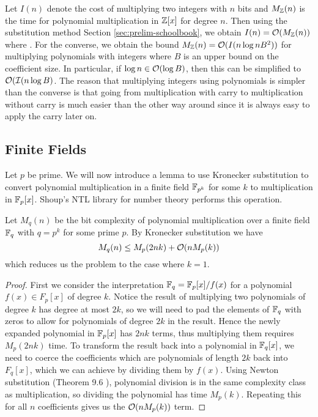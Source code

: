 Let $I(n)$ denote the cost of multiplying two integers with $n$ bits and $M_{\mathbb Z}(n)$ is the time for polynomial multiplication in ${\mathbb Z}[x]$ for degree $n$. Then using the substitution method Section \ref{sec:prelim-schoolbook}, we obtain $I(n) = \mathcal O(M_{\mathbb Z}(n))$ where . For the converse, we obtain the bound $M_{\mathbb Z}(n) = \mathcal O(I(n\log nB^2))$ for multiplying polynomials with integers where $B$ is an upper bound on the coefficient size. In particular, if $\log n \in \mathcal O(\log B)$, then this can be simplified to $\mathcal O(\mathcal I(n \log B)$. The reason that multiplying integers using polynomials is simpler than the converse is that going from multiplication with carry to multiplication without carry is much easier than the other way around since it is always easy to apply the carry later on.

\subsection{Finite Fields}%
\label{sub:finite-field}

Let $p$ be prime. We will now introduce a lemma to use Kronecker substitution to convert polynomial multiplication in a finite field ${\mathbb F}_{p^k}$ for some $k$ to multiplication in ${\mathbb F}_p [x]$. Shoup's NTL library for number theory \cite{ntl} performs this operation.

\begin{lemma}
    Let $M_q(n)$ be the bit complexity of polynomial multiplication over a finite field ${\mathbb F}_q$ with $q = p^k$ for some prime $p$. By Kronecker substitution we have
    \[
        M_q(n) \leq M_p(2nk) + \mathcal O(n M_p(k))
    \]
    which reduces us the problem to the case where $k = 1$.
\end{lemma}

\begin{proof}
    First we consider the interpretation ${\mathbb F}_q = {\mathbb F}_p[x] / f(x)$ for a polynomial $f(x) \in F_p[x]$ of degree $k$. Notice the result of multiplying two polynomials of degree $k$ has degree at most $2k$, so we will need to pad the elements of ${\mathbb F}_q$ with zeros to allow for polynomials of degree $2k$ in the result. Hence the newly expanded polynomial in ${\mathbb F}_p[x]$ has $2nk$ terms, thus multiplying them requires $M_p(2nk)$ time. To transform the result back into a polynomial in ${\mathbb F}_q[x]$, we need to coerce the coefficients which are polynomials of length $2k$ back into $F_q[x]$, which we can achieve by dividing them by $f(x)$. Using Newton substitution (Theorem 9.6 \cite{modern-comp-alg}), polynomial division is in the same complexity class as multiplication, so dividing the polynomial has time $M_p(k)$. Repeating this for all $n$ coefficients gives us the $\mathcal O(n M_p(k))$ term.
\end{proof}

